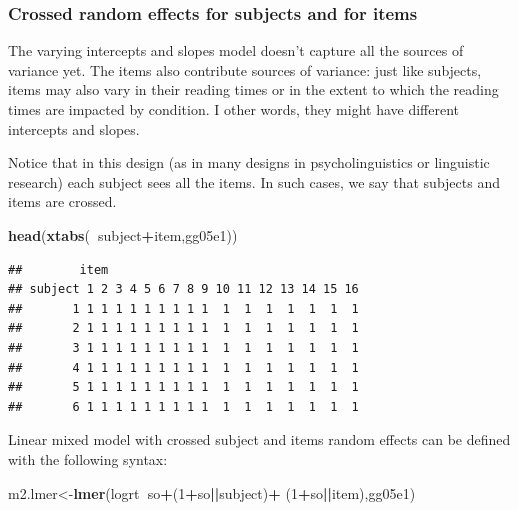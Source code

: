 \documentclass[12pt,]{krantz}
\newenvironment{Shaded}{\begin{snugshade}}{\end{snugshade}}
\newcommand{\DecValTok}[1]{\textcolor[rgb]{0.00,0.00,0.81}{#1}}
\newcommand{\KeywordTok}[1]{\textcolor[rgb]{0.13,0.29,0.53}{\textbf{#1}}}
\newcommand{\NormalTok}[1]{#1}
\newcommand{\OperatorTok}[1]{\textcolor[rgb]{0.81,0.36,0.00}{\textbf{#1}}}
\begin{document}
\hypertarget{crossed-random-effects-for-subjects-and-for-items}{%
\subsubsection{Crossed random effects for subjects and for items}\label{crossed-random-effects-for-subjects-and-for-items}}

The varying intercepts and slopes model doesn't capture all the sources of variance yet. The items also contribute sources of variance: just like subjects, items may also vary in their reading times or in the extent to which the reading times are impacted by condition. I other words, they might have different intercepts and slopes.

Notice that in this design (as in many designs in psycholinguistics or linguistic research) each subject sees all the items. In such cases, we say that subjects and items are crossed.

\begin{Shaded}
\begin{Highlighting}[]
\KeywordTok{head}\NormalTok{(}\KeywordTok{xtabs}\NormalTok{(}\OperatorTok{~}\NormalTok{subject}\OperatorTok{+}\NormalTok{item,gg05e1))}
\end{Highlighting}
\end{Shaded}

\begin{verbatim}
##        item
## subject 1 2 3 4 5 6 7 8 9 10 11 12 13 14 15 16
##       1 1 1 1 1 1 1 1 1 1  1  1  1  1  1  1  1
##       2 1 1 1 1 1 1 1 1 1  1  1  1  1  1  1  1
##       3 1 1 1 1 1 1 1 1 1  1  1  1  1  1  1  1
##       4 1 1 1 1 1 1 1 1 1  1  1  1  1  1  1  1
##       5 1 1 1 1 1 1 1 1 1  1  1  1  1  1  1  1
##       6 1 1 1 1 1 1 1 1 1  1  1  1  1  1  1  1
\end{verbatim}

Linear mixed model with crossed subject and items random effects can be defined with the following syntax:

\begin{Shaded}
\begin{Highlighting}[]
\NormalTok{m2.lmer<-}\KeywordTok{lmer}\NormalTok{(logrt}\OperatorTok{~}\NormalTok{so}\OperatorTok{+}\NormalTok{(}\DecValTok{1}\OperatorTok{+}\NormalTok{so}\OperatorTok{||}\NormalTok{subject)}\OperatorTok{+}
\NormalTok{(}\DecValTok{1}\OperatorTok{+}\NormalTok{so}\OperatorTok{||}\NormalTok{item),gg05e1)}
\end{Highlighting}
\end{Shaded}
\end{document}
